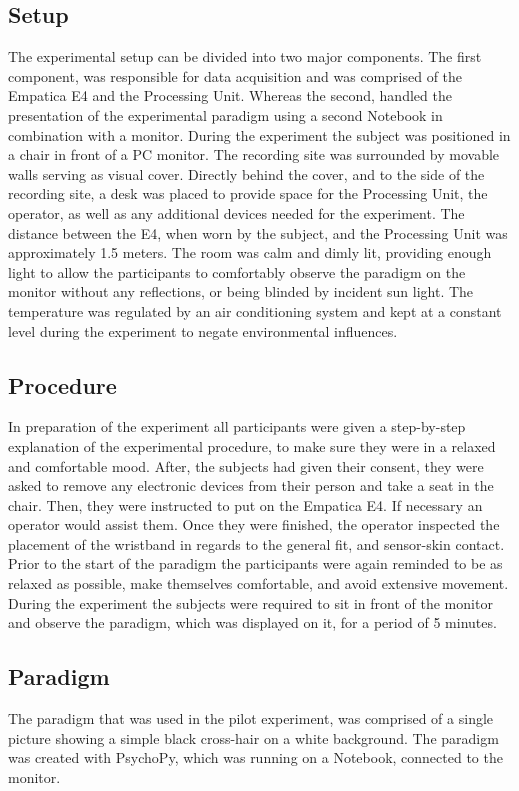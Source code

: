 \subsection{Setup}
The experimental setup can be divided into two major components. The first component, was responsible for data acquisition and was comprised of the Empatica E4 and the Processing Unit. Whereas the second, handled the presentation of the experimental paradigm using a second Notebook in combination with a monitor.
During the experiment the subject was positioned in a chair in front of a PC monitor. The recording site was surrounded by movable walls serving as visual cover. Directly behind the cover, and to the side of the recording site, a desk was placed to provide space for the Processing Unit, the operator, as well as any additional devices needed for the experiment. The distance between the E4, when worn by the subject, and the Processing Unit was approximately 1.5 meters.
The room was calm and dimly lit, providing enough light to allow the participants to comfortably observe the paradigm on the monitor without any reflections, or being blinded by incident sun light. The temperature was regulated by an air conditioning system and kept at a constant level during the experiment to negate environmental influences.
\subsection{Procedure}
In preparation of the experiment all participants were given a step-by-step explanation of the experimental procedure, to make sure they were in a relaxed and comfortable mood. After, the subjects had given their consent, they were asked to remove any electronic devices from their person and take a seat in the chair. Then, they were instructed to put on the Empatica E4. If necessary an operator would assist them. Once they were finished, the operator inspected the placement of the wristband in regards to the general fit, and sensor-skin contact. Prior to the start of the paradigm the participants were again reminded to be as relaxed as possible, make themselves comfortable, and avoid extensive movement. During the experiment the subjects were required to sit in front of the monitor and observe the paradigm, which was displayed on it, for a period of 5 minutes. 
\subsection{Paradigm}
The paradigm that was used in the pilot experiment, was comprised of a single picture showing a simple black cross-hair on a white background. The paradigm was created with PsychoPy, which was running on a Notebook, connected to the monitor. 

